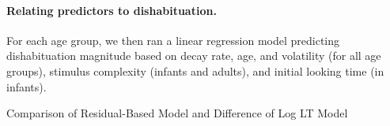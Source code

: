 \documentclass[10pt, letterpaper]{article}
\begin{document}
\hypertarget{relating-predictors-to-dishabituation.}{%
\paragraph{Relating predictors to
dishabituation.}\label{relating-predictors-to-dishabituation.}}

For each age group, we then ran a linear regression model predicting
dishabituation magnitude based on decay rate, age, and volatility (for
all age groups), stimulus complexity (infants and adults), and initial
looking time (in infants).

\begin{table}[t]
    \centering
    \caption{Comparison of Residual-Based Model and Difference of Log LT Model}
    \vspace{0.2cm} %
    \small %
    \renewcommand{\arraystretch}{0.9} %
    \setlength{\tabcolsep}{3pt} %


\end{table}
\end{document}
